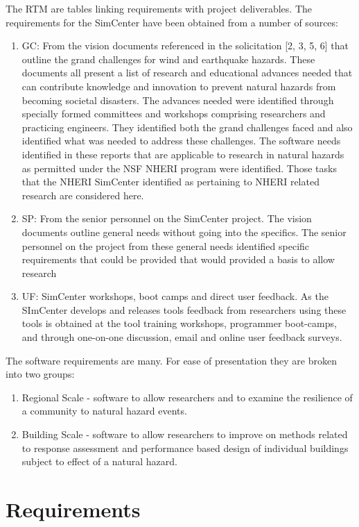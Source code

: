 \documentclass{simcenterdocumentation}
\begin{document}
The RTM are tables linking requirements with project deliverables.  The requirements for the SimCenter have been obtained from a number of sources:
\begin{enumerate}
\item GC: From the vision documents referenced in the solicitation [2, 3, 5, 6] that outline the grand challenges for wind and earthquake hazards. These documents all present a list of research and educational advances needed that can contribute knowledge and innovation to prevent natural hazards from becoming societal disasters. The advances needed were identified through specially formed committees and workshops comprising researchers and practicing engineers. They identified both the grand challenges faced and also identified what was needed to address these challenges. The software needs identified in these reports that are applicable to research in natural hazards as permitted under the NSF NHERI program were identified. Those tasks that the NHERI SimCenter identified as pertaining to NHERI related research are considered here.
\item SP: From the senior personnel on the SimCenter project. The vision documents outline general needs without going into the specifics. The senior personnel on the project from these general needs identified specific requirements that could be provided that would provided a basis to allow research 
\item UF: SimCenter workshops, boot camps and direct user feedback. As the SImCenter develops and releases tools feedback from researchers using these tools is obtained at the tool training workshops, programmer boot-camps,  and through one-on-one discussion, email and online user feedback surveys. 
\end{enumerate}  

The software requirements are many. For ease of presentation they are broken into two groups:
\begin{enumerate}
\item Regional Scale - software to allow researchers and to examine the resilience of a community to natural hazard events.
\item Building Scale - software to allow researchers to improve on methods related to response assessment and performance based design of individual buildings subject to effect of a natural hazard.
\end{enumerate}


\chapter{Requirements}
\label{chap:requirements}
\end{document}
